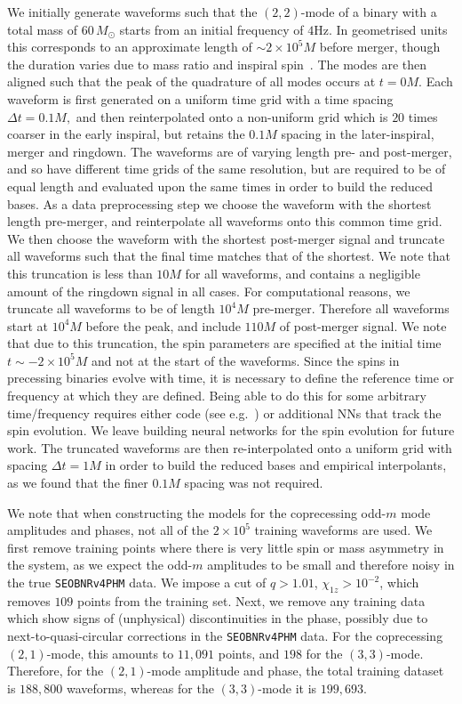 \documentclass[prd,amssymb,amsmath,amsfonts,superscriptaddress,nofootinbib,reprint,showpacs, longbibliography]{revtex4-1}
\newcommand{\SEOB}{\texttt{SEOBNRv4PHM}}
\begin{document}
We initially generate waveforms such that the $(2,2)$-mode of a binary with a total mass of $60\, M_\odot$ starts from an initial frequency of $4$Hz. In geometrised units this corresponds to an approximate length of $\sim 2\times10^5 M$ before merger, though the duration varies due to mass ratio and inspiral spin~\cite{Racine:2008qv, Harry:2016ijz}. 
The modes are then aligned such that the peak of the quadrature of all modes occurs at $t=0M$. 
Each waveform is first generated on a uniform time grid with a time spacing $\Delta t =0.1M,$ and then reinterpolated onto a non-uniform grid which is $20$ times coarser in the early inspiral, but retains the $0.1M$ spacing in the later-inspiral, merger and ringdown. 
The waveforms are of varying length pre- and post-merger, and so have different time grids of the same resolution, but are required to be of equal length and evaluated upon the same times in order to build the reduced bases. 
As a data preprocessing step we choose the waveform with the shortest length pre-merger, and reinterpolate all waveforms onto this common time grid. 
We then choose the waveform with the shortest post-merger signal and truncate all waveforms such that the final time matches that of the shortest. We note that this truncation is less than $10 M$ for all waveforms, and contains a negligible amount of the ringdown signal in all cases. 
For computational reasons, we truncate all waveforms to be of length $10^4M$ pre-merger. 
Therefore all waveforms start at $10^4M$ before the peak, and include $110M$ of post-merger signal. We note that due to this truncation, the spin parameters are specified at the initial time $t\sim -2 \times 10^5M$ and not at the start of the waveforms. Since the spins in precessing binaries evolve with time, it is necessary to define the reference time or frequency at which they are defined. Being able to do this for some arbitrary time/frequency requires either code (see e.g.~\cite{Johnson-McDaniel:2021rvv}) or additional NNs that track the spin evolution. We leave building neural networks for the spin evolution for future work.
The truncated waveforms are then re-interpolated onto a uniform grid with spacing $\Delta t = 1M$ in order to build the reduced bases and empirical interpolants, as we found that the finer $0.1 M$ spacing was not required. 

We note that when constructing the models for the coprecessing odd-$m$ mode amplitudes and phases, not all of the $2\times10^5$ training waveforms are used. We first remove training points where there is very little spin or mass asymmetry in the system, as we expect the odd-$m$ amplitudes to be small and therefore noisy in the true \SEOB{} data. We impose a cut of $q>1.01$, $\chi_{1z}>10^{-2}$, which removes $109$ points from the training set. Next, we remove any training data which show signs of (unphysical) discontinuities in the phase, possibly due to next-to-quasi-circular corrections in the \SEOB{} data. For the coprecessing $(2,1)$-mode, this amounts to $11,091$ points, and $198$ for the $(3,3)$-mode. Therefore, for the $(2,1)$-mode amplitude and phase, the total training dataset is $188,800$ waveforms, whereas for the $(3,3)$-mode it is $199,693$.
\end{document}
